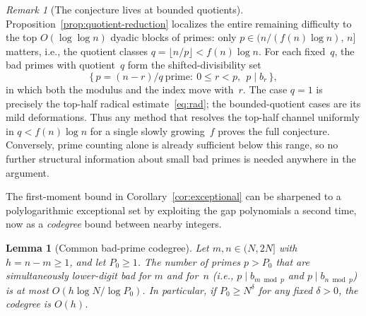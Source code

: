 \documentclass[11pt]{article}
\newtheorem{lemma}[theorem]{Lemma}
\theoremstyle{definition}
\theoremstyle{remark}
\newtheorem{remark}[theorem]{Remark}
\begin{document}
\begin{remark}[The conjecture lives at bounded quotients]
\label{rem:bounded-quotients}
Proposition~\ref{prop:quotient-reduction} localizes the
entire remaining difficulty to the top
$O(\log\log n)$ dyadic blocks of primes:
only $p \in (n/(f(n)\log n),\, n]$ matters, i.e., the
quotient classes $q = \lfloor n/p \rfloor < f(n)\log n$.
For each fixed~$q$, the bad primes with quotient~$q$
form the shifted-divisibility set
\[
  \bigl\{\, p = (n - r)/q \ \text{prime} :\
  0 \le r < p,\ \ p \mid b_r \,\bigr\},
\]
in which both the modulus and the index move with~$r$.
The case $q = 1$ is precisely the top-half radical
estimate~\eqref{eq:rad}; the bounded-quotient cases are
its mild deformations. Thus any method that resolves the
top-half channel uniformly in $q < f(n)\log n$ for a
single slowly growing~$f$ proves the full conjecture.
Conversely, prime counting alone is already sufficient
below this range, so no further structural information
about small bad primes is needed anywhere in the argument.
\end{remark}

The first-moment bound in Corollary~\ref{cor:exceptional}
can be sharpened to a polylogarithmic exceptional set
by exploiting the gap polynomials a second time,
now as a \emph{codegree} bound between nearby integers.

\begin{lemma}[Common bad-prime codegree]\label{lem:codegree}
Let $m, n \in (N, 2N]$ with $h = n - m \ge 1$,
and let $P_0 \ge 1$. The number of primes $p > P_0$
that are simultaneously lower-digit bad for $m$
and for~$n$ (i.e., $p \mid b_{m \bmod p}$ and
$p \mid b_{n \bmod p}$) is at most
$O(h \log N / \log P_0)$.
In particular, if $P_0 \ge N^\delta$ for any
fixed $\delta > 0$, the codegree is $O(h)$.
\end{lemma}
\end{document}

